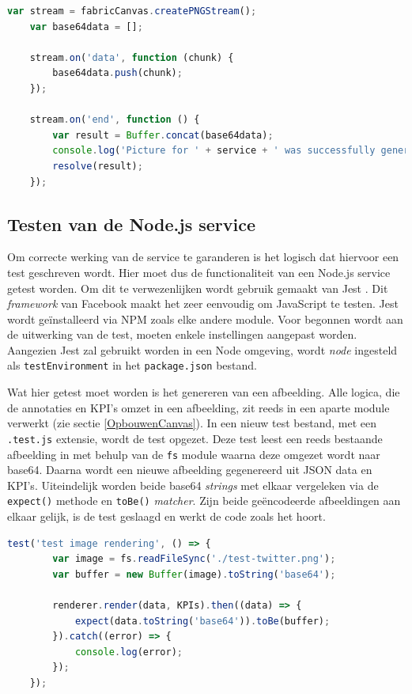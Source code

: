 \begin{lstlisting}[caption={renderer.js - Aanmaken van base64},label=lst:Base64Generation,language=javascript]
	var stream = fabricCanvas.createPNGStream();
	var base64data = [];
	
	stream.on('data', function (chunk) {
		base64data.push(chunk);
	});
	
	stream.on('end', function () {
		var result = Buffer.concat(base64data);
		console.log('Picture for ' + service + ' was successfully generated');
		resolve(result);
	});
\end{lstlisting}

\subsection{Testen van de Node.js service}
Om correcte werking van de service te garanderen is het logisch dat hiervoor een test geschreven wordt. Hier moet dus de functionaliteit van een Node.js service getest worden. Om dit te verwezenlijken wordt gebruik gemaakt van Jest \cite{JestGettingStarted}. Dit \textit{framework} van Facebook maakt het zeer eenvoudig om JavaScript te testen. Jest wordt ge\"{i}nstalleerd via NPM zoals elke andere module. Voor begonnen wordt aan de uitwerking van de test, moeten enkele instellingen aangepast worden. Aangezien Jest zal gebruikt worden in een Node omgeving, wordt \textit{node} ingesteld als \texttt{testEnvironment} in het \texttt{package.json} bestand. 

Wat hier getest moet worden is het genereren van een afbeelding. Alle logica, die de annotaties en KPI's omzet in een afbeelding, zit reeds in een aparte module verwerkt (zie sectie \ref{OpbouwenCanvas}). In een nieuw test bestand, met een \texttt{.test.js} extensie, wordt de test opgezet. Deze test leest een reeds bestaande afbeelding in met behulp van de \texttt{fs} module waarna deze omgezet wordt naar base64. Daarna wordt een nieuwe afbeelding gegenereerd uit JSON data en KPI's. Uiteindelijk worden beide base64 \textit{strings} met elkaar vergeleken via de \texttt{expect()} methode en \texttt{toBe()} \textit{matcher}. Zijn beide ge\"{e}ncodeerde afbeeldingen aan elkaar gelijk, is de test geslaagd en werkt de code zoals het hoort. 

\begin{lstlisting}[caption={render.test.js - Testen van de service},label=lst:RenderTest,language=javascript]
	test('test image rendering', () => {
		var image = fs.readFileSync('./test-twitter.png');
		var buffer = new Buffer(image).toString('base64');
		
		renderer.render(data, KPIs).then((data) => {
			expect(data.toString('base64')).toBe(buffer);
		}).catch((error) => {
			console.log(error);
		});
	});
\end{lstlisting}

